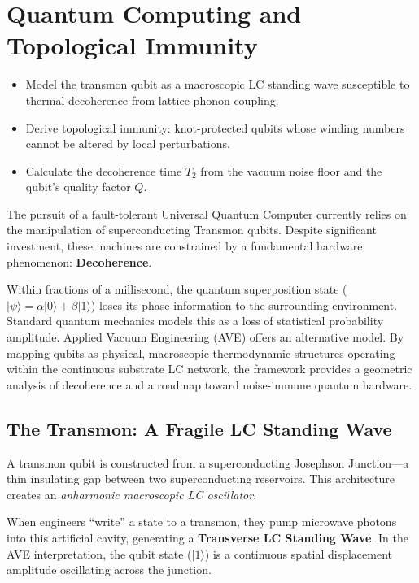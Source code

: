 \chapter{Quantum Computing and Topological Immunity}
\label{ch:quantum_computing}


\begin{objectivebox}
\begin{itemize}
    \item Model the transmon qubit as a macroscopic LC standing wave susceptible to thermal decoherence from lattice phonon coupling.
    \item Derive topological immunity: knot-protected qubits whose winding numbers cannot be altered by local perturbations.
    \item Calculate the decoherence time $T_2$ from the vacuum noise floor and the qubit's quality factor $Q$.
\end{itemize}
\end{objectivebox}

The pursuit of a fault-tolerant Universal Quantum Computer currently relies on the manipulation of superconducting Transmon qubits. Despite significant investment, these machines are constrained by a fundamental hardware phenomenon: \textbf{Decoherence}. 

Within fractions of a millisecond, the quantum superposition state ($|\psi\rangle = \alpha|0\rangle + \beta|1\rangle$) loses its phase information to the surrounding environment. Standard quantum mechanics models this as a loss of statistical probability amplitude. Applied Vacuum Engineering (AVE) offers an alternative model. By mapping qubits as physical, macroscopic thermodynamic structures operating within the continuous substrate LC network, the framework provides a geometric analysis of decoherence and a roadmap toward noise-immune quantum hardware.

\section{The Transmon: A Fragile LC Standing Wave}
A transmon qubit is constructed from a superconducting Josephson Junction---a thin insulating gap between two superconducting reservoirs. This architecture creates an \textit{anharmonic macroscopic LC oscillator}. 

When engineers ``write'' a state to a transmon, they pump microwave photons into this artificial cavity, generating a \textbf{Transverse LC Standing Wave}. In the AVE interpretation, the qubit state ($|1\rangle$) is a continuous spatial displacement amplitude oscillating across the junction.

